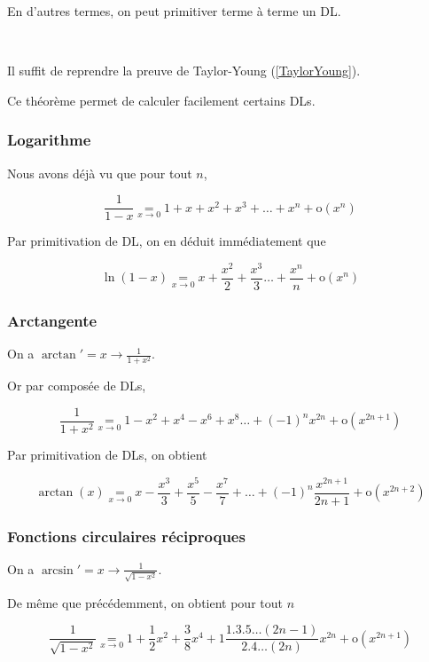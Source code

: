 \documentclass[12pt]{article}
\begin{document}
En d'autres termes, on peut primitiver terme à terme un DL.

\begin{demo}~

Il suffit de reprendre la preuve de Taylor-Young (\ref{TaylorYoung}).
  
\end{demo}

Ce théorème permet de calculer facilement certains DLs.


\subsubsection{Logarithme}

Nous avons déjà vu que pour tout $n$, 

$$\frac{1}{1-x} \underset{x\rightarrow 0}{=} 1 + x +  x^2 + x^3 + \dots + x^n +
\text{o}(x^n)$$

Par primitivation de DL, on en déduit immédiatement que 

$$\ln(1-x) \underset{x\rightarrow 0}{=} x + \frac{x^2}{2} + \frac{x^3}{3}
\dots + \frac{x^n}{n} + \text{o}(x^n)$$


\subsubsection{Arctangente}

On a $\arctan'= x\rightarrow \frac{1}{1+x^2}$.

Or par composée de DLs, 

$$\frac{1}{1+x^2}\underset{x\rightarrow 0}{=} 1-x^2+x^4-x^6+x^8 \dots +(-1)^{n}x^{2n}+\text{o}(x^{2n+1})$$

Par primitivation de DLs, on obtient 

$$\arctan(x)\underset{x\rightarrow 0}{=}
x-\frac{x^3}{3}+\frac{x^{5}}{5}-\frac{x^{7}}{7}+ \dots +
(-1)^{n}\frac{x^{2n+1}}{2n+1}+\text{o}(x^{2n+2}) $$


\subsubsection{Fonctions circulaires réciproques}

On a $\arcsin'= x\rightarrow \frac{1}{\sqrt{1-x^2}}$.

De même que précédemment, on obtient pour tout $n$

$$\frac{1}{\sqrt{1-x^2}} \underset{x\rightarrow 0}{=} 1 +\frac{1}{2} x^2 + \frac{3}{8} x^4 + 1 \frac{1.3.5\dots(2n-1)}{2.4\dots(2n)} x^{2n}+ \text{o}(x^{2n+1})$$
\end{document}
